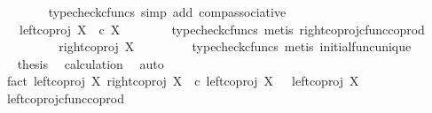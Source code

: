 \begin{isabellebody}
\ \ \ \ \ \ \isamarkupfalse%
\ {\isacharparenleft}{\kern0pt}typecheck{\isacharunderscore}{\kern0pt}cfuncs{\isacharcomma}{\kern0pt}\ simp\ add{\isacharcolon}{\kern0pt}\ comp{\isacharunderscore}{\kern0pt}associative{}{\isacharparenright}{\kern0pt}\isanewline
\ \ \ \ \isamarkupfalse%
\ \isamarkupfalse%
\ {\isachardoublequoteopen}{\isachardot}{\kern0pt}{\isachardot}{\kern0pt}{\isachardot}{\kern0pt}\ {\isacharequal}{\kern0pt}\ {\isacharparenleft}{\kern0pt}left{\isacharunderscore}{\kern0pt}coproj\ X\ {\isasymemptyset}{\isacharparenright}{\kern0pt}\ {\isasymcirc}\isactrlsub c\ {\isasymalpha}\isactrlbsub X\isactrlesub {\isachardoublequoteclose}\isanewline
\ \ \ \ \ \ \isamarkupfalse%
\ {\isacharparenleft}{\kern0pt}typecheck{\isacharunderscore}{\kern0pt}cfuncs{\isacharcomma}{\kern0pt}\ metis\ right{\isacharunderscore}{\kern0pt}coproj{\isacharunderscore}{\kern0pt}cfunc{\isacharunderscore}{\kern0pt}coprod{\isacharparenright}{\kern0pt}\isanewline
\ \ \ \ \isamarkupfalse%
\ \isamarkupfalse%
\ {\isachardoublequoteopen}{\isachardot}{\kern0pt}{\isachardot}{\kern0pt}{\isachardot}{\kern0pt}\ {\isacharequal}{\kern0pt}\ right{\isacharunderscore}{\kern0pt}coproj\ X\ {\isasymemptyset}{\isachardoublequoteclose}\isanewline
\ \ \ \ \ \ \isamarkupfalse%
\ {\isacharparenleft}{\kern0pt}typecheck{\isacharunderscore}{\kern0pt}cfuncs{\isacharcomma}{\kern0pt}\ metis\ initial{\isacharunderscore}{\kern0pt}func{\isacharunderscore}{\kern0pt}unique{\isacharparenright}{\kern0pt}\isanewline
\ \ \ \ \isamarkupfalse%
\ \isamarkupfalse%
\ {\isacharquery}{\kern0pt}thesis\ \isamarkupfalse%
\ calculation\ \isamarkupfalse%
\ auto\isanewline
\ \ \isamarkupfalse%
\isanewline
\ \ \isamarkupfalse%
\ \isamarkupfalse%
\ fact{}{\isacharcolon}{\kern0pt}\ {\isachardoublequoteopen}{\isacharparenleft}{\kern0pt}left{\isacharunderscore}{\kern0pt}coproj\ X\ {\isasymemptyset}{\isacharparenright}{\kern0pt}{\isasymamalg}{\isacharparenleft}{\kern0pt}right{\isacharunderscore}{\kern0pt}coproj\ X\ {\isasymemptyset}{\isacharparenright}{\kern0pt}\ {\isasymcirc}\isactrlsub c\ left{\isacharunderscore}{\kern0pt}coproj\ X\ {\isasymemptyset}\ {\isacharequal}{\kern0pt}\ left{\isacharunderscore}{\kern0pt}coproj\ X\ {\isasymemptyset}{\isachardoublequoteclose}\isanewline
\ \ \ \ \isamarkupfalse%
\ left{\isacharunderscore}{\kern0pt}coproj{\isacharunderscore}{\kern0pt}cfunc{\isacharunderscore}{\kern0pt}coprod\ \isamarkupfalse%

\end{isabellebody}
